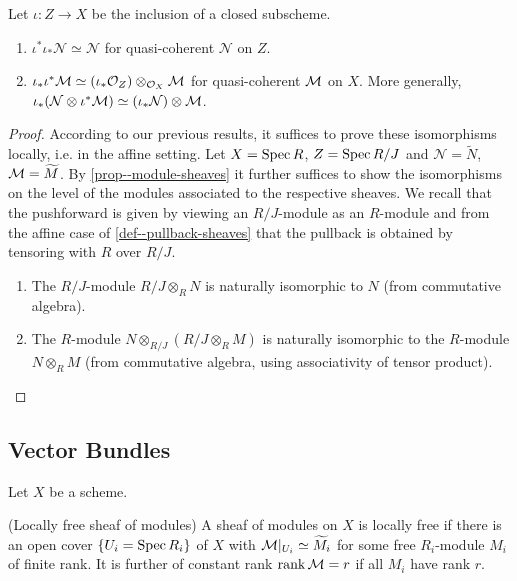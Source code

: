 \documentclass[a4paper,11pt]{article}
\begin{document}
			\begin{prop}
				Let $\iota:Z\rightarrow X$ be the inclusion of a closed subscheme.
				\begin{enumerate}
					\item $\iota^\ast\iota_\ast\mathcal{N}\simeq\mathcal{N}$ for quasi-coherent $\mathcal{N}$ on $Z$.
					\item $\iota_\ast\iota^\ast\mathcal{M}\simeq(\iota_\ast\mathcal{O}_Z)\otimes_{\mathcal{O}_X}\mathcal{M}$ for quasi-coherent $\mathcal{M}$ on $X$. More generally, $\iota_\ast(\mathcal{N}\otimes\iota^\ast\mathcal{M})\simeq(\iota_\ast\mathcal{N})\otimes\mathcal{M}$.
				\end{enumerate}
			\end{prop}
			\begin{proof}
				According to our previous results, it suffices to prove these isomorphisms locally, i.e. in the affine setting. Let $X=\operatorname{Spec} R$, $Z=\operatorname{Spec} R/J$ and $\mathcal{N}=\widetilde{N}$, $\mathcal{M}=\widetilde{M}$. By \autoref{prop--module-sheaves} it further suffices to show the isomorphisms on the level of the modules associated to the respective sheaves. We recall that the pushforward is given by viewing an $R/J$-module as an $R$-module and from the affine case of \autoref{def--pullback-sheaves} that the pullback is obtained by tensoring with $R$ over $R/J$.
				\begin{enumerate}
					\item The $R/J$-module $R/J\otimes_R N$ is naturally isomorphic to $N$ (from commutative algebra).
					\item The $R$-module $N\otimes_{R/J}(R/J\otimes_RM)$ is naturally isomorphic to the $R$-module $N\otimes_RM$ (from commutative algebra, using associativity of tensor product).
				\end{enumerate}
			\end{proof}


		\subsection{Vector Bundles}

			\noindent Let $X$ be a scheme.
			
			\begin{defi}(Locally free sheaf of modules)
				A sheaf of modules on $X$ is locally free if there is an open cover $\{U_i=\operatorname{Spec} R_i\}$ of $X$ with $\mathcal{M}|_{U_i}\simeq\widetilde{M}_i$ for some free $R_i$-module $M_i$ of finite rank. It is further of constant rank $\rank\mathcal{M}=r$ if all $M_i$ have rank $r$.
			\end{defi}
\end{document}
